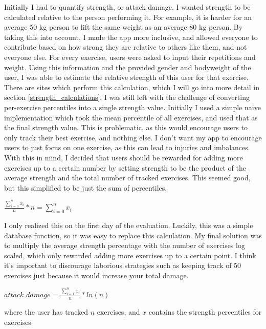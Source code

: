 \documentclass{l4proj}
\begin{document}
Initially I had to quantify strength, or attack damage. I wanted strength to be calculated relative to the person performing it. For example, it is harder for an average 50 kg person to lift the same weight as an average 80 kg person. By taking this into account, I made the app more inclusive, and allowed everyone to contribute based on how strong they are relative to others like them, and not everyone else. For every exercise, users were asked to input their repetitions and weight. Using this information and the provided gender and bodyweight of the user, I was able to estimate the relative strength of this user for that exercise. There are sites which perform this calculation, which I will go into more detail in section \ref{strength_calculations}. I was still left with the challenge of converting per-exercise percentiles into a single strength value. Initially I used a simple naive implementation which took the mean percentile of all exercises, and used that as the final strength value. This is problematic, as this would encourage users to only track their best exercise, and nothing else. I don't want my app to encourage users to just focus on one exercise, as this can lead to injuries and imbalances. With this in mind, I decided that users should be rewarded for adding more exercises up to a certain number by setting strength to be the product of the average strength and the total number of tracked exercises. This seemed good, but this simplified to be just the sum of percentiles.

\begin{algorithm}[H]
  $\frac{\sum_{i=0}^{n} x_i}{n} * n = {\sum_{i=0}^{n} x_i}$
\end{algorithm}

I only realized this on the first day of the evaluation. Luckily, this was a simple database function, so it was easy to replace this calculation. 
My final solution was to multiply the average strength percentage with the number of exercises log scaled, which only rewarded adding more exercises up to a certain point. I think it's important to discourage laborious strategies such as keeping track of 50 exercises just because it would increase your total damage. 

\begin{algorithm}
  $attack\_damage = \frac{\sum_{i=1}^{n} x_i}{n} * ln(n) $

  where the user has tracked $n$ exercises, and $x$ contains the strength percentiles for exercises 
\end{algorithm}
\end{document}
